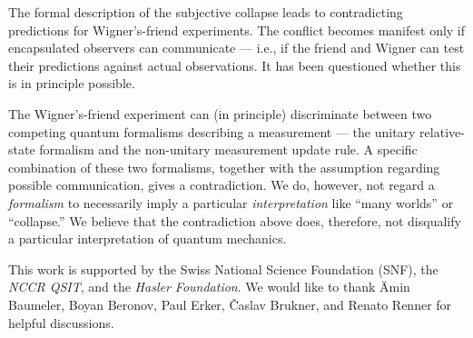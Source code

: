 \documentclass[aps,pra,12pt]{revtex4-2}
\theoremstyle{definition}
\theoremstyle{remark}
\begin{document}
The formal description of the subjective collapse leads to contradicting predictions for Wigner's-friend experiments. 
The conflict becomes manifest only if encapsulated observers can communicate --- i.e., if the friend and Wigner can test their predictions against actual observations. 
It has been questioned whether this is in principle possible.

The Wigner's-friend experiment can (in principle) discriminate between two competing quantum formalisms describing a measurement --- the unitary relative-state formalism and the non-unitary measurement update rule. 
A specific combination of these two formalisms, together with the assumption regarding possible communication, gives a contradiction.
We do, however, not regard a \emph{formalism} to necessarily imply a particular \emph{interpretation} like ``many worlds'' or ``collapse.''
We believe that the contradiction above does, therefore, not disqualify a particular interpretation of quantum mechanics.

 

\begin{acknowledgments}
\noindent
This work is supported by the Swiss National Science Foundation (SNF), the \emph{NCCR QSIT}, and the \emph{Hasler Foundation}. We would like to thank \"Amin Baumeler, Boyan Beronov, Paul Erker, \v Caslav Brukner, and Renato Renner for helpful discussions.
\end{acknowledgments}
\end{document}
